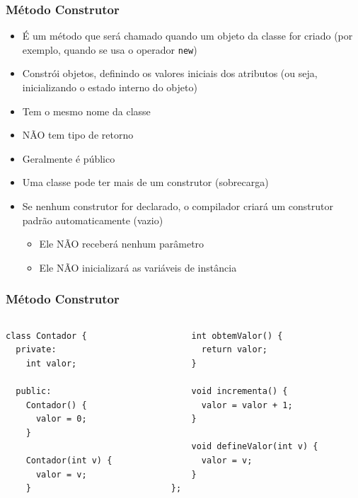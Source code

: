 \documentclass[aspectratio=169]{beamer}
\begin{document}
\begin{frame}\frametitle{Método Construtor}
\begin{itemize}
	\item É um método que será chamado quando um objeto da classe for criado (por exemplo, quando se usa o operador \texttt{new})
	\item Constrói objetos, definindo os valores iniciais dos atributos (ou seja, inicializando o estado interno do objeto)
	\item Tem o mesmo nome da classe
	\item NÃO tem tipo de retorno
	\item Geralmente é público
	\item Uma classe pode ter mais de um construtor (sobrecarga)
	\item Se nenhum construtor for declarado, o compilador criará um construtor padrão automaticamente (vazio)
	\begin{itemize}
		\item Ele NÃO receberá nenhum parâmetro
		\item Ele NÃO inicializará as variáveis de instância
	\end{itemize}
\end{itemize}
\end{frame}

\begin{frame}[fragile]\frametitle{Método Construtor}
\begin{columns}[T]
\begin{column}{0.5\linewidth}
\begin{lstlisting}
class Contador {
  private:
    int valor;

  public:
    Contador() {
      valor = 0;
    }

    Contador(int v) {
      valor = v;
    }
\end{lstlisting}
\end{column}
\begin{column}{0.5\linewidth}
\begin{lstlisting}
    int obtemValor() {
      return valor;
    }

    void incrementa() {
      valor = valor + 1;
    }

    void defineValor(int v) {
      valor = v;
    }
};
\end{lstlisting}
\end{column}
\end{columns}
\end{frame}
\end{document}
